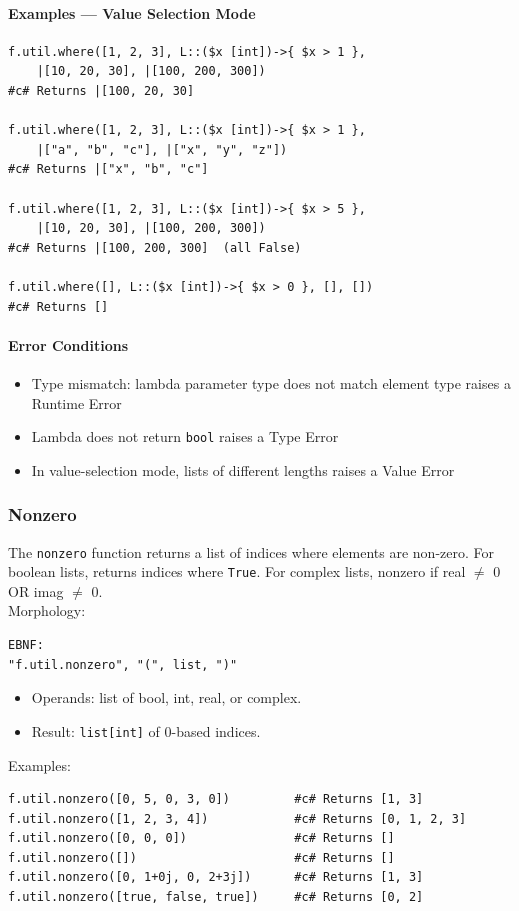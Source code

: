 \paragraph{Examples — Value Selection Mode}
\begin{verbatim}
f.util.where([1, 2, 3], L::($x [int])->{ $x > 1 },
    |[10, 20, 30], |[100, 200, 300])
#c# Returns |[100, 20, 30]

f.util.where([1, 2, 3], L::($x [int])->{ $x > 1 },
    |["a", "b", "c"], |["x", "y", "z"])
#c# Returns |["x", "b", "c"]

f.util.where([1, 2, 3], L::($x [int])->{ $x > 5 },
    |[10, 20, 30], |[100, 200, 300])
#c# Returns |[100, 200, 300]  (all False)

f.util.where([], L::($x [int])->{ $x > 0 }, [], [])
#c# Returns []
\end{verbatim}

\paragraph{Error Conditions}
\begin{itemize}
\item Type mismatch: lambda parameter type does not match element type raises a Runtime Error
\item Lambda does not return \texttt{bool} raises a Type Error
\item In value-selection mode, lists of different lengths raises a Value Error
\end{itemize}

\subsubsection{Nonzero}
The \texttt{nonzero} function returns a list of indices where elements are non-zero. For boolean lists, returns indices where \texttt{True}. For complex lists, nonzero if real $\neq$ 0 OR imag $\neq$ 0.\\
Morphology:
\begin{verbatim}
EBNF:
"f.util.nonzero", "(", list, ")"
\end{verbatim}
\begin{itemize}
\item Operands: list of bool, int, real, or complex.
\item Result: \texttt{list[int]} of 0-based indices.
\end{itemize}

Examples:
\begin{verbatim}
f.util.nonzero([0, 5, 0, 3, 0])         #c# Returns [1, 3]
f.util.nonzero([1, 2, 3, 4])            #c# Returns [0, 1, 2, 3]
f.util.nonzero([0, 0, 0])               #c# Returns []
f.util.nonzero([])                      #c# Returns []
f.util.nonzero([0, 1+0j, 0, 2+3j])      #c# Returns [1, 3]
f.util.nonzero([true, false, true])     #c# Returns [0, 2]
\end{verbatim}

